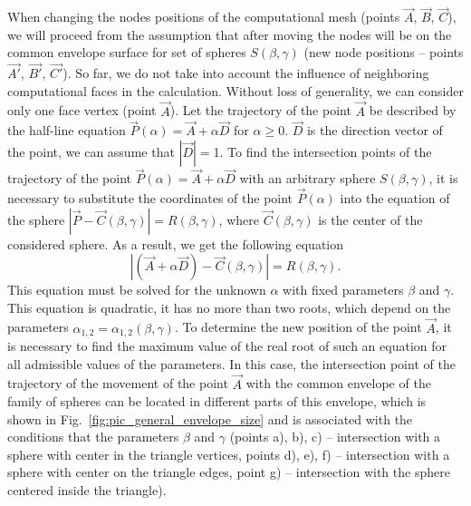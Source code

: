 \documentclass[
11pt,
tightenlines,
twoside,
onecolumn,
nofloats,
nobibnotes,
nofootinbib,
superscriptaddress,
noshowpacs,
centertags]
{revtex4-2}
\begin{document}
When changing the nodes positions of the computational  mesh (points
$\vec{A}$, $\vec{B}$, $\vec{C}$), we will proceed from the
assumption that after moving the nodes will be on the common
envelope surface for set of spheres $ S(\beta, \gamma)$ (new node
positions -- points $\vec{A'}$, $\vec{B'}$, $\vec{C'}$).
So far, we do not take into account the influence of neighboring
computational faces in the calculation.
Without loss of generality, we can consider only one face vertex (point $\vec{A}$).
Let the trajectory of the point $\vec{A}$ be described by the
half-line equation $\vec{P}(\alpha) = \vec{A} + \alpha \vec{D}$ for
$\alpha \ge 0$.
$\vec{D}$ is the direction vector of the point, we can assume  that
$|\vec{D}| = $1.
To find the intersection points of the trajectory of the point
$\vec{P}(\alpha) = \vec{A} + \alpha \vec{D}$ with an arbitrary
sphere $S(\beta, \gamma)$, it is necessary to substitute the
coordinates of the point $\vec{P}(\alpha)$ into the equation of the
sphere $|\vec{P} - \vec{C}(\beta, \gamma)| = R(\beta, \gamma)$,
where $\vec{C}(\beta, \gamma)$ is the center of the considered
sphere.
As a result, we get the following equation
\begin{equation}\label{eqn:intersect}
|(\vec{A} + \alpha \vec{D}) - \vec{C}(\beta, \gamma)| = R(\beta,
\gamma).
\end{equation}
This equation must be solved for the unknown $\alpha$ with fixed parameters $\beta$ and $\gamma$.
This equation is quadratic, it has no more than two roots, which depend on the parameters $\alpha_{1,2} = \alpha_{1,2}(\beta, \gamma)$.
To determine the new position of the point $\vec{A}$, it is necessary to find the maximum value of the real root of such an equation for all admissible values of the parameters.
In this case, the intersection point of the trajectory of the
movement of the point  $\vec{A}$ with the common envelope of the
family of spheres can be located in different parts of this
envelope, which is shown in Fig.~\ref{fig:pic_general_envelope_size}
and is associated with the conditions that the parameters $\beta$
and $\gamma$ (points a), b), c) -- intersection with a sphere with
center in the triangle vertices, points d), e), f) -- intersection
with a sphere with center on the triangle edges, point g) --
intersection with the sphere centered inside the triangle).
\end{document}
